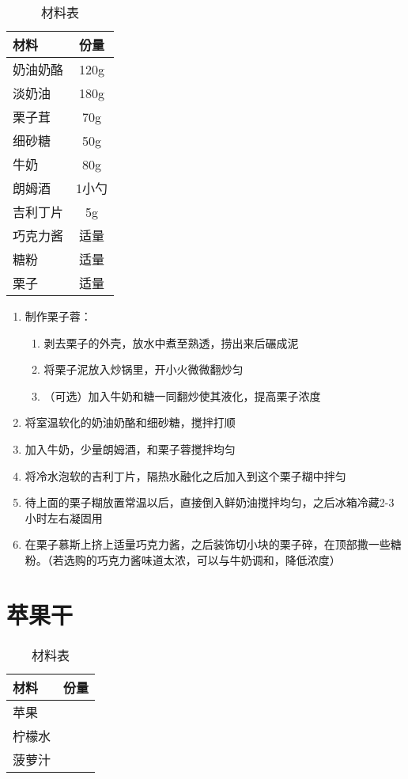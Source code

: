 \begin{table}[H]
    \centering
    \begin{tabular}{|l||c|}\hline
     \textbf{材料}    &  \textbf{份量}\\ \hline\hline
    奶油奶酪 &  120g\\ \hline
    淡奶油 &  180g\\ \hline
    栗子茸  &  70g\\ \hline
    细砂糖  &  50g \\ \hline
    牛奶  & 80g\\ \hline
    朗姆酒  & 1小勺\\ \hline
    吉利丁片 & 5g \\ \hline
    巧克力酱 & 适量 \\ \hline
    糖粉 & 适量 \\ \hline
    栗子 & 适量 \\ \hline
    \end{tabular}
    \caption{材料表}
\end{table}

\begin{enumerate}
    \item 制作栗子蓉：
    \begin{enumerate}
    \item 剥去栗子的外壳，放水中煮至熟透，捞出来后碾成泥
    \item 将栗子泥放入炒锅里，开小火微微翻炒匀
    \item （可选）加入牛奶和糖一同翻炒使其液化，提高栗子浓度
    \end{enumerate}
    \item 将室温软化的奶油奶酪和细砂糖，搅拌打顺
    \item 加入牛奶，少量朗姆酒，和栗子蓉搅拌均匀
    \item 将冷水泡软的吉利丁片，隔热水融化之后加入到这个栗子糊中拌匀
    \item 待上面的栗子糊放置常温以后，直接倒入鲜奶油搅拌均匀，之后冰箱冷藏2-3小时左右凝固用
    \item 在栗子慕斯上挤上适量巧克力酱，之后装饰切小块的栗子碎，在顶部撒一些糖粉。（若选购的巧克力酱味道太浓，可以与牛奶调和，降低浓度）
\end{enumerate}


\section{苹果干}

\begin{table}[H]
    \centering
    \begin{tabular}{|l||c|}\hline
     \textbf{材料}    &  \textbf{份量}\\ \hline\hline
    苹果 &  \\ \hline
    柠檬水 &  \\ \hline
    菠萝汁 & \\ \hline
    \end{tabular}
    \caption{材料表}
\end{table}

